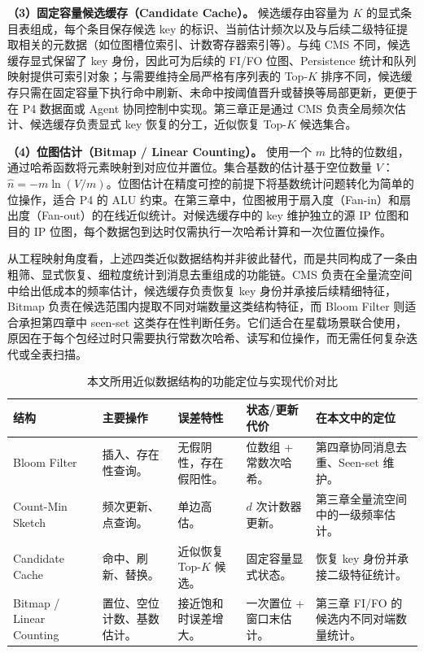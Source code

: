 \textbf{（3）固定容量候选缓存（Candidate Cache）。} 候选缓存由容量为 $K$ 的显式条目表组成，每个条目保存候选 key 的标识、当前估计频次以及与后续二级特征提取相关的元数据（如位图槽位索引、计数寄存器索引等）。与纯 CMS 不同，候选缓存显式保留了 key 身份，因此可为后续的 FI/FO 位图、Persistence 统计和队列映射提供可索引对象；与需要维持全局严格有序列表的 Top-$K$ 排序不同，候选缓存只需在固定容量下执行命中刷新、未命中按阈值晋升或替换等局部更新，更便于在 P4 数据面或 Agent 协同控制中实现。第三章正是通过 CMS 负责全局频次估计、候选缓存负责显式 key 恢复的分工，近似恢复 Top-$K$ 候选集合。

\textbf{（4）位图估计（Bitmap / Linear Counting）。} 使用一个 $m$ 比特的位数组，通过哈希函数将元素映射到对应位并置位。集合基数的估计基于空位数量 $V$：$\hat{n} = -m \ln(V/m)$。位图估计在精度可控的前提下将基数统计问题转化为简单的位操作，适合 P4 的 ALU 约束。在第三章中，位图被用于扇入度（Fan-in）和扇出度（Fan-out）的在线近似统计。对候选缓存中的 key 维护独立的源 IP 位图和目的 IP 位图，每个数据包到达时仅需执行一次哈希计算和一次位置位操作。



从工程映射角度看，上述四类近似数据结构并非彼此替代，而是共同构成了一条由粗筛、显式恢复、细粒度统计到消息去重组成的功能链。CMS 负责在全量流空间中给出低成本的频率估计，候选缓存负责恢复 key 身份并承接后续精细特征，Bitmap 负责在候选范围内提取不同对端数量这类结构特征，而 Bloom Filter 则适合承担第四章中 seen-set 这类存在性判断任务。它们适合在星载场景联合使用，原因在于每个包经过时只需要执行常数次哈希、读写和位操作，而无需任何复杂迭代或全表扫描。

\begin{table}[t]
\centering
\caption{本文所用近似数据结构的功能定位与实现代价对比}
\label{tab:ch2_ds_compare}
\small
\begin{tabular}{@{}
>{\raggedright\arraybackslash}p{2.4cm}
>{\raggedright\arraybackslash}p{2.3cm}
>{\raggedright\arraybackslash}p{2.1cm}
>{\raggedright\arraybackslash}p{2.4cm}
>{\raggedright\arraybackslash}p{3.3cm}
@{}}
\toprule
\textbf{结构} & \textbf{主要操作} & \textbf{误差特性} & \textbf{状态/更新代价} & \textbf{在本文中的定位} \\
\midrule
Bloom Filter & 插入、存在性查询。 & 无假阴性，存在假阳性。 & 位数组 + 常数次哈希。 & 第四章协同消息去重、Seen-set 维护。 \\
\midrule
Count-Min Sketch & 频次更新、点查询。 & 单边高估。 & $d$ 次计数器更新。 & 第三章全量流空间中的一级频率估计。 \\
\midrule
Candidate Cache & 命中、刷新、替换。 & 近似恢复 Top-$K$ 候选。 & 固定容量显式状态。 & 恢复 key 身份并承接二级特征统计。 \\
\midrule
Bitmap / Linear Counting & 置位、空位计数、基数估计。 & 接近饱和时误差增大。 & 一次置位 + 窗口末估计。 & 第三章 FI/FO 的候选内不同对端数量统计。 \\
\bottomrule
\end{tabular}
\end{table}



